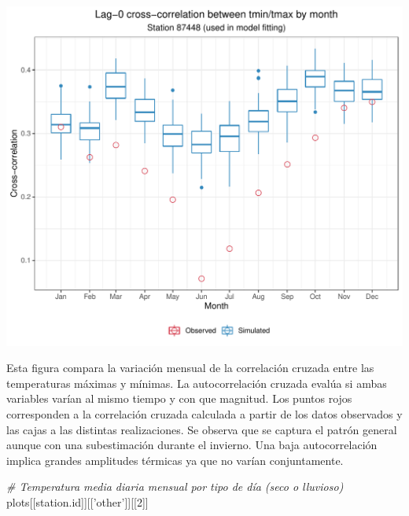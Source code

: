 \documentclass[
]{article}
\newenvironment{Shaded}{}{}
\newcommand{\CommentTok}[1]{\textcolor[rgb]{0.38,0.63,0.69}{\textit{#1}}}
\newcommand{\DecValTok}[1]{\textcolor[rgb]{0.25,0.63,0.44}{#1}}
\newcommand{\NormalTok}[1]{#1}
\newcommand{\StringTok}[1]{\textcolor[rgb]{0.25,0.44,0.63}{#1}}
\begin{document}
\begin{center}\includegraphics{Webinario_Generador_files/figure-latex/unnamed-chunk-56-1} \end{center}

Esta figura compara la variación mensual de la correlación cruzada entre las temperaturas máximas y mínimas. La autocorrelación cruzada evalúa si ambas variables varían al mismo tiempo y con que magnitud. Los puntos rojos corresponden a la correlación cruzada calculada a partir de los datos observados y las cajas a las distintas realizaciones. Se observa que se captura el patrón general aunque con una subestimación durante el invierno. Una baja autocorrelación implica grandes amplitudes térmicas ya que no varían conjuntamente.

\begin{Shaded}
\begin{Highlighting}[]
\CommentTok{# Temperatura media diaria mensual por tipo de día (seco o lluvioso)}
\NormalTok{plots[[station.id]][[}\StringTok{'other'}\NormalTok{]][[}\DecValTok{2}\NormalTok{]]}
\end{Highlighting}
\end{Shaded}
\end{document}
